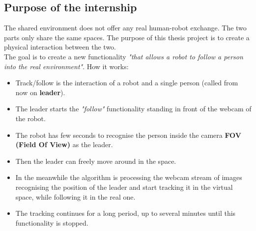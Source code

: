 \subsection{Purpose of the internship}
The shared environment does not offer any real human-robot exchange. The two parts only share the same spaces. The purpose of this thesis project is to create a physical interaction between the two.\\
The goal is to create a new functionality \textit{"that allows a robot to follow a person into the real environment"}. How it works:
\begin{itemize}
	\item Track/follow is the interaction of a robot and a single person (called from now on \textbf{leader}).
	\item The leader starts the \textit{"follow"} functionality standing in front of the webcam of the robot.
	\item The robot has few seconds to recognise the person inside the camera \textbf{FOV (Field Of View)} as the leader.
	\item Then the leader can freely move around in the space. 
	\item In the meanwhile the algorithm is processing the webcam stream of images recognising the position of the leader and start tracking it in the virtual space, while following it in the real one.
	\item The tracking continues for a long period, up to several minutes until this functionality is stopped.
\end{itemize}

